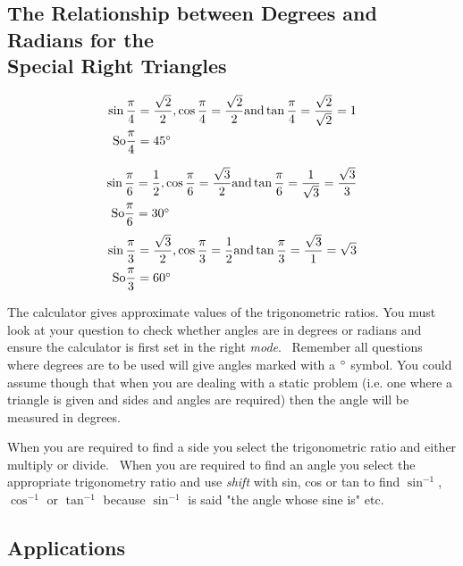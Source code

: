 \subsection{The Relationship between Degrees and Radians for the \\ Special Right Triangles}

\begin{align*}\sin  \frac{\pi }{4} &  =  \frac{\sqrt{2}}{2}\text{,}\cos  \frac{\pi }{4} =\frac{\sqrt{2}}{2}\text{and}\tan  \frac{\pi }{4} =\frac{\sqrt{2}}{\sqrt{2}} =1 \\
\text{So}\frac{\pi }{4} &  =  45 \mbox{{\ensuremath{{}^\circ}}}\end{align*}


\begin{align*}\sin  \frac{\pi }{6} &  =  \frac{1}{2}\text{,}\cos  \frac{\pi }{6} =\frac{\sqrt{3}}{2}\text{and}\tan  \frac{\pi }{6} =\frac{1}{\sqrt{3}} =\frac{\sqrt{3}}{3} \\
\text{So}\frac{\pi }{6} &  =  30 \mbox{{\ensuremath{{}^\circ}}}\end{align*}
\begin{align*}\sin  \frac{\pi }{3} &  =  \frac{\sqrt{3}}{2}\text{,}\cos  \frac{\pi }{3} =\frac{1}{2}\text{and}\tan  \frac{\pi }{3} =\frac{\sqrt{3}}{1} =\sqrt{3} \\
\text{So}\frac{\pi }{3} &  =  60 \mbox{{\ensuremath{{}^\circ}}}\end{align*}

The calculator gives approximate values of the trigonometric ratios. You
must look at your question to check whether angles are in degrees or radians and ensure the calculator is first set in the right \emph{mode}.
\ Remember all questions where degrees are to be used will give angles marked with a $\mbox{{\ensuremath{{}^\circ}}}$ symbol. You could assume though that when you
are dealing with a static problem (i.e. one where a triangle is given and sides and angles are required) then the angle will be measured in degrees. 

When you are required to find a side you select the trigonometric ratio and either multiply or divide.
\ When you are required to find an angle you select the appropriate trigonometry ratio and use \emph{shift}
with sin, cos or tan to find $\sin ^{ -1}$, $\cos ^{ -1}$ or $\tan ^{ -1}$ because $\sin ^{ -1}$ is said "the angle whose sine is" etc. 

\subsection{Applications}
 

